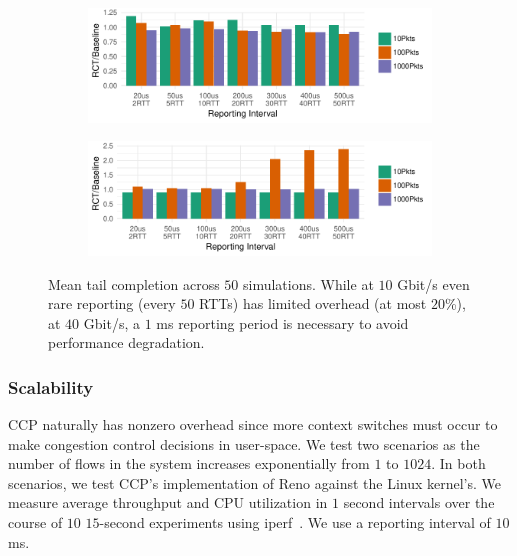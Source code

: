 \begin{figure}
    \centering
    \begin{subfigure}{\columnwidth}
    \centering
    \includegraphics[width=\columnwidth]{img/10g-rct}
    \label{fig:eval:lowrtt:10g}
    \end{subfigure}
    \begin{subfigure}{\columnwidth}
    \centering
    \includegraphics[width=\columnwidth]{img/40g-rct}
    \label{fig:eval:lowrtt:40g}
    \end{subfigure}
    \caption{Mean tail completion across $50$ simulations. While at $10$ Gbit/s even rare reporting (every $50$ RTTs) has limited overhead (at most $20$\%), at $40$ Gbit/s, a $1$ ms reporting period is necessary to avoid performance degradation.}
    \label{fig:eval:lowrtt}
\end{figure}

\subsubsection{Scalability}
\label{sec:eval:whyfold:scale}

CCP naturally has nonzero overhead since more context switches must occur to make congestion control decisions in user-space.
We test two scenarios as the number of flows in the system increases exponentially from $1$ to $1024$.
In both scenarios, we test CCP's implementation of Reno against the Linux kernel's. We measure average throughput and CPU utilization in $1$ second intervals over the course of $10$ $15$-second experiments using iperf~\cite{iperf}. We use a reporting interval of $10$ ms.

